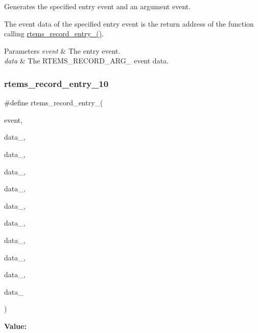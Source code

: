 Generates the specified entry event and an argument event. 

The event data of the specified entry event is the return address of the function calling \mbox{\hyperlink{group__RTEMSRecord_ga9344d5b82305235c0616959f1cb147c6}{rtems\+\_\+record\+\_\+entry\+\_()}}.


\begin{DoxyParams}{Parameters}
{\em event} & The entry event. \\
\hline
{\em data} & The R\+T\+E\+M\+S\+\_\+\+R\+E\+C\+O\+R\+D\+\_\+\+A\+R\+G\+\_ event data. \\
\hline
\end{DoxyParams}
\mbox{\label{group__RTEMSRecord_ga77b28bbc6adb1973946c1c849ef621eb}} 
\subsubsection{\texorpdfstring{rtems\_record\_entry\_10}{rtems\_record\_entry\_10}}
{\footnotesize\ttfamily \#define rtems\+\_\+record\+\_\+entry\+\_(\begin{DoxyParamCaption}\item[{}]{event,  }\item[{}]{data\+\_,  }\item[{}]{data\+\_,  }\item[{}]{data\+\_,  }\item[{}]{data\+\_,  }\item[{}]{data\+\_,  }\item[{}]{data\+\_,  }\item[{}]{data\+\_,  }\item[{}]{data\+\_,  }\item[{}]{data\+\_,  }\item[{}]{data\+\_ }\end{DoxyParamCaption})}

{\bfseries Value\+:}
\begin{DoxyCode}{0}
\DoxyCodeLine{  )}

\end{DoxyCode}


